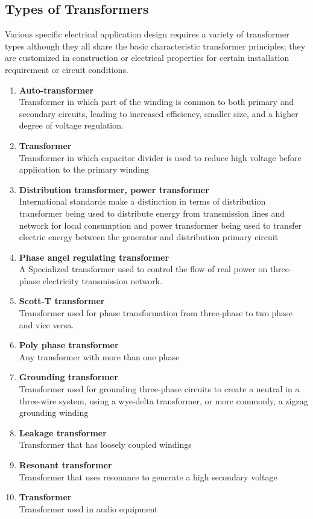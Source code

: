 \documentclass[12pt,fleqn]{book} %
\begin{document}
\subsection{Types of Transformers}
Various specific electrical application design requires a variety of transformer types although they all share the basic characteristic transformer principles; they are customized in construction or electrical properties for certain installation requirement or circuit conditions.
\begin{enumerate}
 \item \textbf {Auto-transformer}
 \\ Transformer in which part of the winding is common to both primary and secondary circuits, leading to increased efficiency, smaller size, and a higher degree of voltage regulation.
 \item \textbf {Transformer}
 \\ Transformer in which capacitor divider is used to reduce high voltage before application to the primary winding
 \item \textbf {Distribution transformer, power transformer}
 \\ International standards make a distinction in terms of distribution transformer being used to distribute energy from transmission lines and network for local consumption and power transformer being used to transfer electric energy between the generator and distribution primary circuit
 \item \textbf {Phase angel regulating transformer}
 \\ A Specialized transformer used to control the flow of real power on three-phase electricity transmission network.
 \item \textbf {Scott-T transformer}
 \\ Transformer used for phase transformation from three-phase to two phase and vice versa.
 \item \textbf {Poly phase transformer}
 \\ Any transformer with more than one phase
 \item \textbf {Grounding transformer}
 \\ Transformer used for grounding three-phase circuits to create a neutral in a three-wire system, using a wye-delta transformer, or more commonly, a zigzag grounding winding
 \item \textbf {Leakage transformer}
 \\ Transformer that has loosely coupled windings
 \item \textbf {Resonant transformer}
 \\ Transformer that uses resonance to generate a high secondary voltage 
 \item \textbf {Transformer}
 \\ Transformer used in audio equipment
 \end{enumerate}
\end{document}
